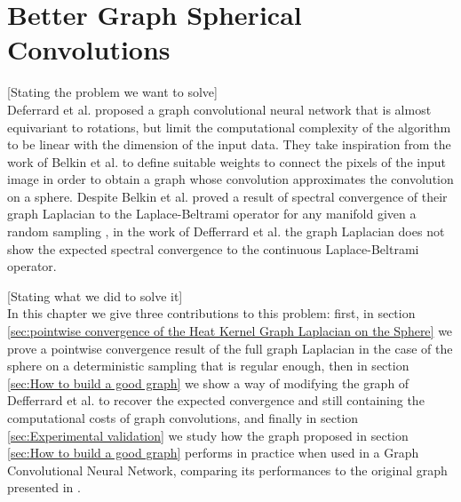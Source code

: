 

\section{Better Graph Spherical Convolutions}
[Stating the problem we want to solve]\\
Deferrard et al. \cite{DeepSphere} proposed a graph convolutional neural network that is almost equivariant to rotations, but limit the computational complexity of the algorithm to be linear with the dimension of the input data. They take inspiration from the work of Belkin et al. \cite{Belkin:2005:TTF:2138147.2138189} to define suitable weights to connect the pixels of the input image in order to obtain a graph whose convolution approximates the convolution on a sphere. Despite Belkin et al. proved a result of spectral convergence of their graph Laplacian to the Laplace-Beltrami operator for any manifold given a random sampling \cite{NIPS2006_2989}, in the work of Defferrard et al. the graph Laplacian does not show the expected spectral convergence to the continuous Laplace-Beltrami operator. 

[Stating what we did to solve it]\\
In this chapter we give three contributions to this problem: first, in section \ref{sec:pointwise convergence of the Heat Kernel Graph Laplacian on the Sphere} we prove a pointwise convergence result of the full graph Laplacian in the case of the sphere on a deterministic sampling that is regular enough, then in section \ref{sec:How to build a good graph} we show a way of modifying the graph of Defferrard et al. to recover the expected convergence and still containing the computational costs of graph convolutions, and finally in section \ref{sec:Experimental validation} we study how the graph proposed in section \ref{sec:How to build a good graph} performs in practice when used in a Graph Convolutional Neural Network, comparing its performances to the original graph presented in \cite{DeepSphere}.

